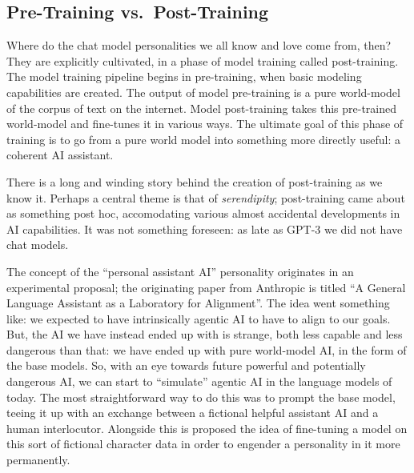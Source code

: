 \subsection{Pre-Training vs.\ Post-Training}
Where do the chat model personalities we all know and love come from, then?
They are explicitly cultivated, in a phase of model training called
post-training. The model training pipeline begins in pre-training, when basic
modeling capabilities are created. The output of model pre-training is a pure
world-model of the corpus of text on the internet. Model post-training takes
this pre-trained world-model and fine-tunes it in various ways. The ultimate
goal of this phase of training is to go from a pure world model into something
more directly useful: a coherent AI assistant.

There is a long and winding story behind the creation of post-training as we
know it. Perhaps a central theme is that of \emph{serendipity}; post-training
came about as something post hoc, accomodating various almost accidental
developments in AI capabilities. It was not something foreseen: as late as
GPT-3 we did not have chat models.

The concept of the ``personal assistant AI'' personality originates in an
experimental proposal; the originating paper from Anthropic is titled ``A
General Language Assistant as a Laboratory for
Alignment''\cite{askell2021assistant}. The idea went
something like: we expected to have intrinsically agentic AI to have to align
to our goals. But, the AI we have instead ended up with is strange, both less
capable and less dangerous than that: we have ended up with pure world-model
AI, in the form of the base models. So, with an eye towards future powerful and
potentially dangerous AI, we can start to ``simulate'' agentic AI in the
language models of today. The most straightforward way to do this was to prompt
the base model, teeing it up with an exchange between a fictional helpful
assistant AI and a human interlocutor. Alongside this is proposed the idea of
fine-tuning a model on this sort of fictional character data in order to
engender a personality in it more permanently.

